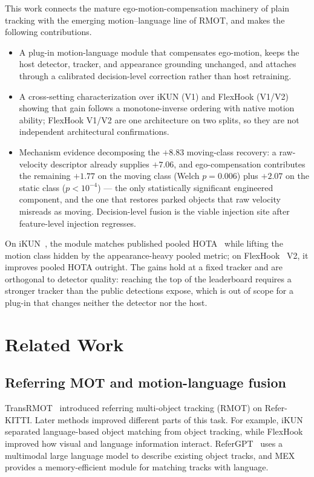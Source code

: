 \documentclass[sigconf,anonymous,nonacm]{acmart}
\begin{document}
This work connects the mature ego-motion-compensation machinery of plain tracking with the emerging motion--language line of RMOT, and makes the following contributions.
\begin{itemize}
  \item A plug-in motion-language module that compensates ego-motion, keeps the host detector, tracker, and appearance grounding unchanged, and attaches through a calibrated decision-level correction rather than host retraining.
  \item A cross-setting characterization over iKUN (V1) and FlexHook (V1/V2) showing that gain follows a monotone-inverse ordering with native motion ability; FlexHook V1/V2 are one architecture on two splits, so they are not independent architectural confirmations.
  \item Mechanism evidence decomposing the $+8.83$ moving-class recovery: a raw-velocity descriptor already supplies $+7.06$, and ego-compensation contributes the remaining $+1.77$ on the moving class (Welch $p{=}0.006$) plus $+2.07$ on the static class ($p{<}10^{-4}$) --- the only statistically significant engineered component, and the one that restores parked objects that raw velocity misreads as moving. Decision-level fusion is the viable injection site after feature-level injection regresses.
\end{itemize}

On iKUN~\cite{ikun}, the module matches published pooled HOTA~\cite{hota} while lifting the motion class hidden by the appearance-heavy pooled metric; on FlexHook~\cite{flexhook} V2, it improves pooled HOTA outright. The gains hold at a fixed tracker and are orthogonal to detector quality: reaching the top of the leaderboard requires a stronger tracker than the public detections expose, which is out of scope for a plug-in that changes neither the detector nor the host.

\section{Related Work}
\label{sec:related}

\subsection{Referring MOT and motion-language fusion}
TransRMOT~\cite{transrmot} introduced referring multi-object tracking (RMOT) on Refer-KITTI. Later methods improved different parts of this task. For example, iKUN~\cite{ikun} separated language-based object matching from object tracking, while FlexHook~\cite{flexhook} improved how visual and language information interact. ReferGPT~\cite{refergpt} uses a multimodal large language model to describe existing object tracks, and MEX~\cite{mex} provides a memory-efficient module for matching tracks with language.
\end{document}
